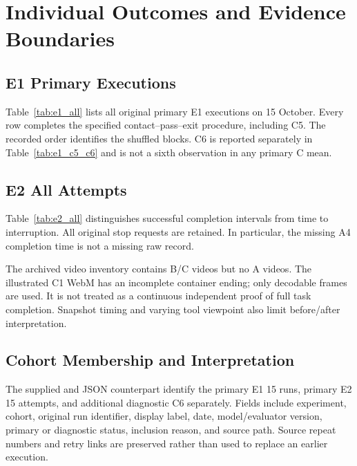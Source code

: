 \chapter{Individual Outcomes and Evidence Boundaries}
\label{app:runs}

\section{E1 Primary Executions}
Table~\ref{tab:e1_all} lists all original primary E1 executions on 15 October. Every row completes the specified contact--pass--exit procedure, including C5. The recorded order identifies the shuffled blocks. C6 is reported separately in Table~\ref{tab:e1_c5_c6} and is not a sixth observation in any primary C mean.

\begin{table}[tbp]\centering\small
\caption[Individual primary E1 outcomes]{All 15 primary E1 executions under \texttt{pass\_height\_ref\_v2}. All are procedurally completed. Full run identifiers, original labels, and source paths are preserved in the cohort manifest.}
\label{tab:e1_all}
\end{table}

\section{E2 All Attempts}
Table~\ref{tab:e2_all} distinguishes successful completion intervals from time to interruption. All original stop requests are retained. In particular, the missing A4 completion time is not a missing raw record.

\begin{table}[tbp]\centering\small
\caption[Individual E2 corrected task outcomes]{Individual E2 task outcomes after the A4 field correction. ``Operator completed'' uses the recorded operator interpretation; it is not an automatic E1 evaluation.}
\label{tab:e2_all}
\end{table}

The archived video inventory contains B/C videos but no A videos. The illustrated C1 WebM has an incomplete container ending; only decodable frames are used. It is not treated as a continuous independent proof of full task completion. Snapshot timing and varying tool viewpoint also limit before/after interpretation.

\section{Cohort Membership and Interpretation}
The supplied  and JSON counterpart identify the primary E1 15 runs, primary E2 15 attempts, and additional diagnostic C6 separately. Fields include experiment, cohort, original run identifier, display label, date, model/evaluator version, primary or diagnostic status, inclusion reason, and source path. Source repeat numbers and retry links are preserved rather than used to replace an earlier execution.

